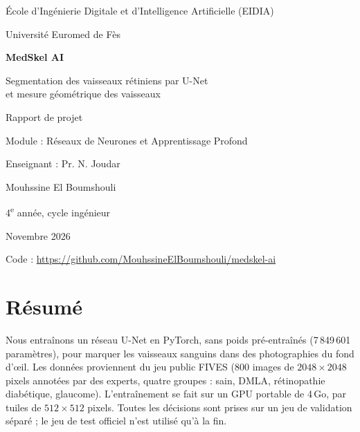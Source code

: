 \documentclass[11pt,a4paper]{article}
\begin{document}
\begin{titlepage}
\centering
{\large École d'Ingénierie Digitale et d'Intelligence Artificielle (EIDIA)\par}
{\large Université Euromed de Fès\par}
\vspace{2.6cm}
{\Huge\bfseries\color{teal} MedSkel AI\par}
\vspace{0.5cm}
{\LARGE Segmentation des vaisseaux rétiniens par U-Net\\[2pt] et mesure géométrique des vaisseaux\par}
\vspace{1.4cm}
\vspace{2cm}

{\large Rapport de projet\par}
{Module : Réseaux de Neurones et Apprentissage Profond\par}
{Enseignant : Pr. N. Joudar\par}
\vfill
{\Large Mouhssine El Boumshouli\par}
{4\textsuperscript{e} année, cycle ingénieur\par}
\vspace{0.4cm}
{Novembre 2026\par}
{\small Code : \url{https://github.com/MouhssineElBoumshouli/medskel-ai}\par}
\end{titlepage}

\section*{Résumé}
Nous entraînons un réseau U-Net en PyTorch, sans poids pré-entraînés (7\,849\,601 paramètres), pour marquer les vaisseaux sanguins dans des photographies du fond d'œil. Les données proviennent du jeu public FIVES (800 images de $2048\times2048$ pixels annotées par des experts, quatre groupes : sain, DMLA, rétinopathie diabétique, glaucome). L'entraînement se fait sur un GPU portable de 4\,Go, par tuiles de $512\times512$ pixels. Toutes les décisions sont prises sur un jeu de validation séparé ; le jeu de test officiel n'est utilisé qu'à la fin.
\end{document}

